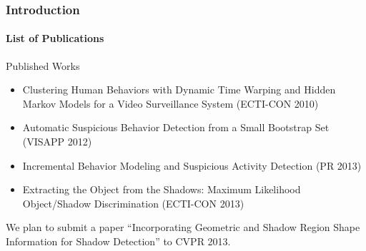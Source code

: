
\begin{frame}
    \frametitle{Introduction}
    \framesubtitle{List of Publications}

    Published Works
    \begin{itemize}
        \item Clustering Human Behaviors with Dynamic Time Warping and 
            Hidden Markov Models for a Video Surveillance System 
            (ECTI-CON 2010)
        \item Automatic Suspicious Behavior Detection from a Small 
            Bootstrap Set (VISAPP 2012)
        \item Incremental Behavior Modeling and Suspicious Activity 
            Detection (PR 2013)
        \item Extracting the Object from the Shadows: Maximum Likelihood 
            Object/Shadow Discrimination (ECTI-CON 2013)
    \end{itemize}
    
    \medskip
    
    We plan to submit a paper ``Incorporating Geometric and Shadow 
    Region Shape Information for Shadow Detection'' to CVPR 2013.

\end{frame}

